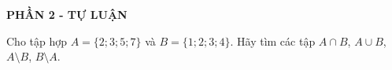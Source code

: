 \begin{center}
	\textbf{PHẦN 2 - TỰ LUẬN}
\end{center}

\begin{bt}%
Cho tập hợp $A=\{2 ; 3 ; 5 ; 7\}$ và $B=\{1 ; 2 ; 3 ; 4\}$. Hãy tìm các tập $A \cap B$, $A \cup B$, $A \setminus B$, $B \setminus A$.
\end{bt}
